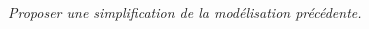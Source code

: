 \documentclass[10pt,fleqn]{article} %
\begin{document}
\begin{multicols}{2}
\subparagraph{}
\textit{Proposer une simplification de la modélisation précédente.   }
\ifprof
\begin{corrige}
\end{corrige}
\else
\fi



%
%
%

\end{multicols}
\end{document}
